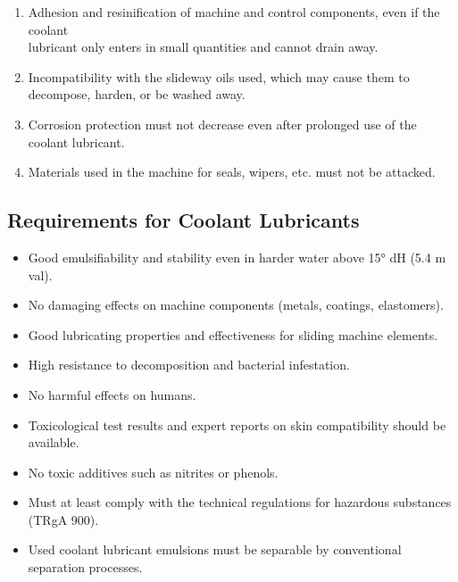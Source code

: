 \begin{enumerate}
    \item Adhesion and resinification of machine and control components, even if the coolant \\lubricant only enters in small quantities and cannot drain away.
    \item Incompatibility with the slideway oils used, which may cause them to decompose, harden, or be washed away.
    \item Corrosion protection must not decrease even after prolonged use of the coolant lubricant.
    \item Materials used in the machine for seals, wipers, etc. must not be attacked.
\end{enumerate}

\subsection*{Requirements for Coolant Lubricants\footnotemark[2]}

\begin{itemize}
    \item Good emulsifiability and stability even in harder water above 15° dH (5.4 m val).
    \item No damaging effects on machine components (metals, coatings, elastomers).
    \item Good lubricating properties and effectiveness for sliding machine elements.
    \item High resistance to decomposition and bacterial infestation.
    \item No harmful effects on humans.
    \item Toxicological test results and expert reports on skin compatibility should be available.
    \item No toxic additives such as nitrites or phenols.
    \item Must at least comply with the technical regulations for hazardous substances (TRgA 900).
    \item Used coolant lubricant emulsions must be separable by conventional separation processes.
\end{itemize}

\newpage

